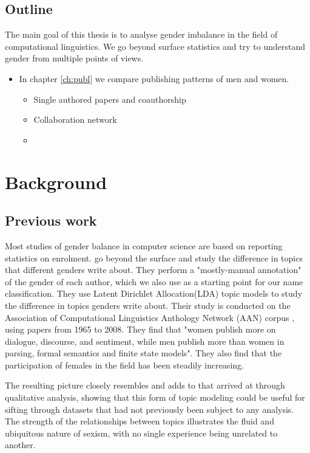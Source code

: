 \documentclass[bsc,frontabs,twoside,singlespacing,parskip,deptreport]{infthesis}     %
\begin{document}
\section{Outline}
The main goal of this thesis is to analyse gender imbalance in the field of computational linguistics. We go beyond surface statistics and try to understand gender from multiple points of views.

\begin{itemize}
\item In chapter \ref{ch:publ} we compare publishing patterns of men and women. 
    \begin{itemize}
    \item Single authored papers and coauthorship
    \item Collaboration network
    \item 
    \end{itemize}
\end{itemize}

\chapter{Background}

\section{Previous work}

Most studies of gender balance in computer science are based on reporting statistics on enrolment. \cite{Jurafsky_Hesaid} go beyond the surface and study the difference in topics that different genders write about. They perform a "mostly-manual annotation" of the gender of each author, which we also use as a starting point for our name classification. They use Latent Dirichlet Allocation(LDA) topic models \citep{Blei_LDA} to study the difference in topics genders write about. Their study is conducted on the Association of Computational Linguistics Anthology Network (AAN) corpus \citep{aan}, using papers from 1965 to 2008. They find that "women publish more on dialogue, discourse, and sentiment, while men publish more than women in parsing, formal semantics and finite state models". They also find that the participation of females in the field has been steadily increasing.

 The resulting picture closely resembles and adds to that arrived at through qualitative analysis, showing that this form of topic modeling could be useful for sifting through datasets that had not previously been subject to any analysis. The strength of the relationships between topics illustrates the fluid and ubiquitous nature of sexism, with no single experience being unrelated to another.
\end{document}
